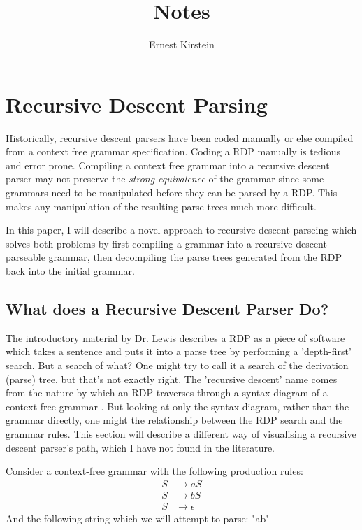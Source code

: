 \documentclass[11pt]{article}
\begin{document}
\title{Notes}
\author{Ernest Kirstein}
\maketitle

\section{Recursive Descent Parsing}
\label{rdp}
Historically, recursive descent parsers have been coded manually or else compiled from 
a context free grammar specification. \cite{compiler} 
Coding a RDP manually is tedious and error prone.
Compiling a context free grammar into a recursive descent parser
may not preserve the {\em strong equivalence} of the grammar
since some grammars need to be manipulated before
they can be parsed by a RDP. This makes any manipulation of the
resulting parse trees much more difficult. 

In this paper, I will describe a novel approach to recursive descent parseing
which solves both problems by first compiling a grammar into a recursive descent
parseable grammar, then decompiling the parse trees generated from the RDP back into
the initial grammar.


\subsection{What does a Recursive Descent Parser Do?}
The introductory material by Dr. Lewis \cite{lewis} describes a RDP as a piece of software which takes 
a sentence and puts it into a parse tree by performing a 'depth-first' search. 
But a search of what? One might try to call it a search of the derivation (parse) tree, but that's not exactly right.
The 'recursive descent' name comes from the nature by which an RDP traverses through a
syntax diagram of a context free grammar \cite{compiler}. 
But looking at only the syntax diagram, rather than the
grammar directly, one might the relationship between the
RDP search and the grammar rules.
This section will describe a different way of visualising a recursive descent parser's path,
which I have not found in the literature.

Consider a context-free grammar with the following production rules:
\setcounter{equation}{0}
\begin{align}
S &\rightarrow a S\\
S &\rightarrow b S\\
S &\rightarrow \epsilon
\end{align}
And the following string which we will attempt to parse: "ab"
\end{document}
